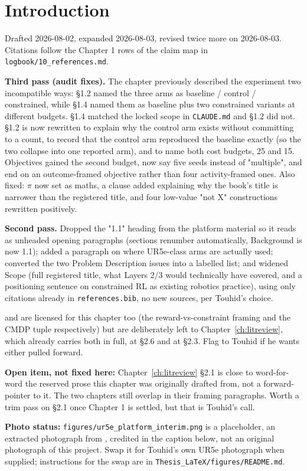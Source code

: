 \chapter{Introduction}\label{ch:intro}

\begin{draftnote}
Drafted 2026-08-02, expanded 2026-08-03, revised twice more on 2026-08-03. Citations follow the
Chapter 1 rows of the claim map in \texttt{logbook/10\_references.md}.

\textbf{Third pass (audit fixes).} The chapter previously described the experiment two
incompatible ways: \S1.2 named the three arms as baseline / control / constrained, while \S1.4
named them as baseline plus two constrained variants at different budgets. \S1.4 matched the
locked scope in \texttt{CLAUDE.md} and \S1.2 did not. \S1.2 is now rewritten to explain why the
control arm exists without committing to a count, to record that the control arm reproduced the
baseline exactly (so the two collapse into one reported arm), and to name both cost budgets, 25
and 15. Objectives gained the second budget, now say five seeds instead of "multiple", and end on
an outcome-framed objective rather than four activity-framed ones. Also fixed: \(\pi\) now set as
maths, a clause added explaining why the book's title is narrower than the registered title, and
four low-value "not X" constructions rewritten positively.

\textbf{Second pass.} Dropped the "1.1" heading from the platform material so it reads as unheaded
opening paragraphs (sections renumber automatically, Background is now 1.1); added a paragraph on
where UR5e-class arms are actually used; converted the two Problem Description issues into a
labelled list; and widened Scope (full registered title, what Layers 2/3 would technically have
covered, and a positioning sentence on constrained RL as existing robotics practice), using only
citations already in \texttt{references.bib}, no new sources, per Touhid's choice.

\cite{shen2022reactive} and \cite{altman1999cmdp} are licensed for this chapter too (the
reward-vs-constraint framing and the CMDP tuple respectively) but are deliberately left to
Chapter~\ref{ch:litreview}, which already carries both in full, \cite{shen2022reactive} at \S2.6
and \cite{altman1999cmdp} at \S2.3. Flag to Touhid if he wants either pulled forward.

\textbf{Open item, not fixed here:} Chapter~\ref{ch:litreview} \S2.1 is close to word-for-word the
reserved prose this chapter was originally drafted from, not a forward-pointer to it. The two
chapters still overlap in their framing paragraphs. Worth a trim pass on \S2.1 once Chapter 1 is
settled, but that is Touhid's call.

\textbf{Photo status:} \texttt{figures/ur5e\_platform\_interim.png} is a placeholder, an extracted
photograph from \cite{xia2024proactive}, credited in the caption below, not an original
photograph of this project. Swap it for Touhid's own UR5e photograph when supplied; instructions
for the swap are in \texttt{Thesis\_LaTeX/figures/README.md}.
\end{draftnote}

